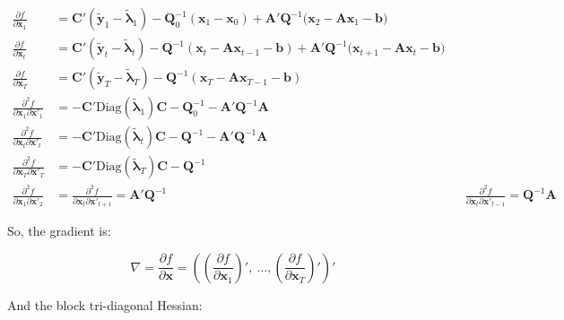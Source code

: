 \documentclass[]{article}
\begin{document}
\begin{align*}
	\frac{\partial f}{\partial\mathbf{x}_{1}} &= \mathbf{C'}\left( {\widetilde{\mathbf{y}}}_{1} - {\widetilde{\bm{\lambda}}}_{1} \right) - \mathbf{Q}_{0}^{- 1}\left( \mathbf{x}_{1} - \mathbf{x}_{0} \right) + \mathbf{A}'\mathbf{Q}^{- 1}\mathbf{(}\mathbf{x}_{2} - \mathbf{A}\mathbf{x}_{1} - \mathbf{b)} \\
	\frac{\partial f}{\partial\mathbf{x}_{t}} &= \mathbf{C'}\left( {\widetilde{\mathbf{y}}}_{t} - {\widetilde{\bm{\lambda}}}_{t} \right) - \mathbf{Q}^{- 1}\left( \mathbf{x}_{t} - \mathbf{A}\mathbf{x}_{t - 1} - \mathbf{b} \right) + \mathbf{A}'\mathbf{Q}^{- 1}(\mathbf{x}_{t + 1} - \mathbf{A}\mathbf{x}_{t} -\mathbf{b)}\\
	\frac{\partial f}{\partial\mathbf{x}_{T}} &= \mathbf{C'}\left( {\widetilde{\mathbf{y}}}_{T} - {\widetilde{\bm{\lambda}}}_{T} \right) - \mathbf{Q}^{- 1}\left( \mathbf{x}_{T} - \mathbf{A}\mathbf{x}_{T - 1} - \mathbf{b} \right)\\
	\frac{\partial^{2}f}{\partial\mathbf{x}_{1}\partial\mathbf{x}'_{1}} &= - \mathbf{C'}\text{Diag}\left( {\widetilde{\bm{\lambda}}}_{1} \right)\mathbf{C} - \mathbf{Q}_{0}^{- 1} - \mathbf{A}'\mathbf{Q}^{- 1}\mathbf{A}\\
	\frac{\partial^{2}f}{\partial\mathbf{x}_{t}\partial\mathbf{x}'_{t}} &= - \mathbf{C'}\text{Diag}\left( {\widetilde{\bm{\lambda}}}_{t} \right)\mathbf{C} - \mathbf{Q}^{- 1} - \mathbf{A}'\mathbf{Q}^{- 1}\mathbf{A}\\
	\frac{\partial^{2}f}{\partial\mathbf{x}_{T}\partial\mathbf{x}'_{T}} &= - \mathbf{C'}\text{Diag}\left( {\widetilde{\bm{\lambda}}}_{T} \right)\mathbf{C} - \mathbf{Q}^{- 1}\\
	\frac{\partial^{2}f}{\partial\mathbf{x}_{1}\partial\mathbf{x}'_{2}} &= \frac{\partial^{2}f}{\partial\mathbf{x}_{t}\partial\mathbf{x}'_{t + 1}} = \mathbf{A}'\mathbf{Q}^{- 1}
	&&\frac{\partial^{2}f}{\partial\mathbf{x}_{t}\partial\mathbf{x}'_{t - 1}} = \mathbf{Q}^{- 1}\mathbf{A}
\end{align*}

So, the gradient is:

\[\nabla = \frac{\partial f}{\partial\mathbf{x}} = \left( \left( \frac{\partial f}{\partial\mathbf{x}_{1}} \right)',\ \ldots,\left( \frac{\partial f}{\partial\mathbf{x}_{T}} \right)' \right)'\]

And the block tri-diagonal Hessian:
\end{document}
